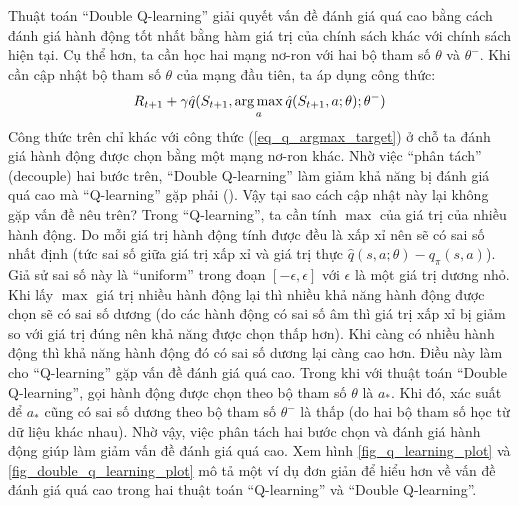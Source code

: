	Thuật toán ``Double Q-learning'' giải quyết vấn đề đánh giá quá cao bằng cách đánh giá hành động tốt nhất bằng hàm giá trị của chính sách khác với chính sách hiện tại.
	Cụ thể hơn, ta cần học hai mạng nơ-ron với hai bộ tham số $\theta$ và $\theta^{-}$.
	Khi cần cập nhật bộ tham số $\theta$ của mạng đầu tiên, ta áp dụng công thức:
	\begin{equation}
		\label{eq_dq_argmax_target}
		R_{t+1} + \gamma \hat{q}(S_{t+1}, \operatorname*{arg\,max}_{a}\hat{q}(S_{t+1}, a;\theta); \theta^{-})
	\end{equation}
	Công thức trên chỉ khác với công thức (\ref{eq_q_argmax_target}) ở chỗ ta đánh giá hành động được chọn bằng một mạng nơ-ron khác.
	Nhờ việc ``phân tách'' (decouple) hai bước trên, ``Double Q-learning'' làm giảm khả năng bị đánh giá quá cao mà ``Q-learning'' gặp phải (\cite{hasselt2010double}).
	Vậy tại sao cách cập nhật này lại không gặp vấn đề nêu trên?
	Trong ``Q-learning'', ta cần tính $\max$ của giá trị của nhiều hành động.
	Do mỗi giá trị hành động tính được đều là xấp xỉ nên sẽ có sai số nhất định (tức sai số giữa giá trị xấp xỉ và giá trị thực $\hat{q}(s, a;\theta) - q_{\pi}(s, a)$).
	Giả sử sai số này là ``uniform'' trong đoạn $[-\epsilon, \epsilon]$ với $\epsilon$ là một giá trị dương nhỏ.
	Khi lấy $\max$ giá trị nhiều hành động lại thì nhiều khả năng hành động được chọn sẽ có sai số dương (do các hành động có sai số âm thì giá trị xấp xỉ bị giảm so với giá trị đúng nên khả năng được chọn thấp hơn).
	Khi càng có nhiều hành động thì khả năng hành động đó có sai số dương lại càng cao hơn.
	Điều này làm cho ``Q-learning'' gặp vấn đề đánh giá quá cao.
	Trong khi với thuật toán ``Double Q-learning'', gọi hành động được chọn theo bộ tham số $\theta$ là $a_{*}$.
	Khi đó, xác suất để $a_{*}$ cũng có sai số dương theo bộ tham số $\theta^{-}$ là thấp (do hai bộ tham số học từ dữ liệu khác nhau).
	Nhờ vậy, việc phân tách hai bước chọn và đánh giá hành động giúp làm giảm vấn đề đánh giá quá cao.
	Xem hình \ref{fig_q_learning_plot} và \ref{fig_double_q_learning_plot} mô tả một ví dụ đơn giản để hiểu hơn về vấn đề đánh giá quá cao trong hai thuật toán ``Q-learning'' và ``Double Q-learning''.
